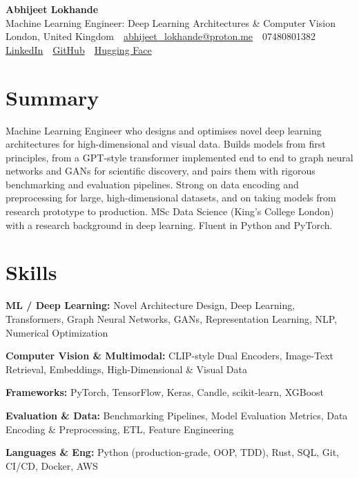 \documentclass[10pt,a4paper]{article}
\newcommand{\sep}{\,\textcolor{accent!60}{\textbar}\,}
\begin{document}
\begin{center}
  {\fontsize{24}{26}\selectfont\bfseries Abhijeet Lokhande}\\[3pt]
  {\color{accent}\large Machine Learning Engineer: Deep Learning Architectures \& Computer Vision}\\[5pt]
  {\small
    London, United Kingdom \sep
    \href{mailto:abhijeet_lokhande@proton.me}{abhijeet\_lokhande@proton.me} \sep
    07480801382 \\[2pt]
    \href{https://www.linkedin.com/in/ablds/}{LinkedIn} \sep
    \href{https://github.com/abhijeetscode}{GitHub} \sep
    \href{https://huggingface.co/ab-ai}{Hugging Face}
  }
\end{center}
\vspace{2pt}

\section{Summary}
Machine Learning Engineer who designs and optimises novel deep learning architectures for high-dimensional and visual data. Builds models from first principles, from a GPT-style transformer implemented end to end to graph neural networks and GANs for scientific discovery, and pairs them with rigorous benchmarking and evaluation pipelines. Strong on data encoding and preprocessing for large, high-dimensional datasets, and on taking models from research prototype to production. MSc Data Science (King's College London) with a research background in deep learning. Fluent in Python and PyTorch.

\section{Skills}
\begin{tight}
  \item[\textcolor{accent}{\small$\bullet$}] \textbf{ML / Deep Learning:} Novel Architecture Design, Deep Learning, Transformers, Graph Neural Networks, GANs, Representation Learning, NLP, Numerical Optimization
  \item[\textcolor{accent}{\small$\bullet$}] \textbf{Computer Vision \& Multimodal:} CLIP-style Dual Encoders, Image-Text Retrieval, Embeddings, High-Dimensional \& Visual Data
  \item[\textcolor{accent}{\small$\bullet$}] \textbf{Frameworks:} PyTorch, TensorFlow, Keras, Candle, scikit-learn, XGBoost
  \item[\textcolor{accent}{\small$\bullet$}] \textbf{Evaluation \& Data:} Benchmarking Pipelines, Model Evaluation Metrics, Data Encoding \& Preprocessing, ETL, Feature Engineering
  \item[\textcolor{accent}{\small$\bullet$}] \textbf{Languages \& Eng:} Python (production-grade, OOP, TDD), Rust, SQL, Git, CI/CD, Docker, AWS
\end{tight}
\end{document}
